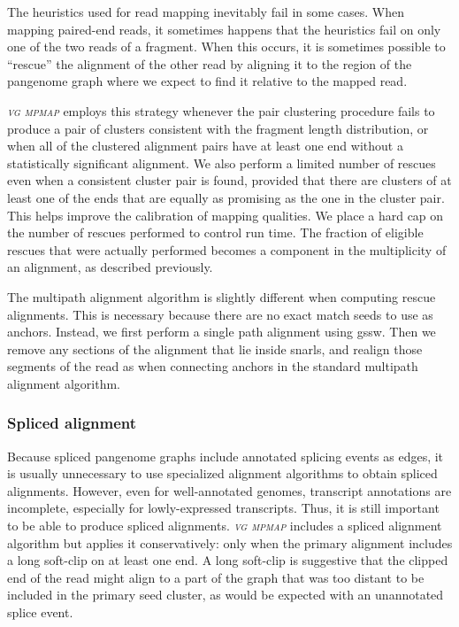 \documentclass[11pt]{ucthesis}
\newcommand{\tool}[1]{\emph{\textsc{#1}}}
\begin{document}
The heuristics used for read mapping inevitably fail in some cases. When mapping paired-end reads, it sometimes happens that the heuristics fail on only one of the two reads of a fragment. When this occurs, it is sometimes possible to ``rescue'' the alignment of the other read by aligning it to the region of the pangenome graph where we expect to find it relative to the mapped read. 

\tool{vg mpmap} employs this strategy whenever the pair clustering procedure fails to produce a pair of clusters consistent with the fragment length distribution, or when all of the clustered alignment pairs have at least one end without a statistically significant alignment. We also perform a limited number of rescues even when a consistent cluster pair is found, provided that there are clusters of at least one of the ends that are equally as promising as the one in the cluster pair. This helps improve the calibration of mapping qualities. We place a hard cap on the number of rescues performed to control run time. The fraction of eligible rescues that were actually performed becomes a component in the multiplicity of an alignment, as described previously.

The multipath alignment algorithm is slightly different when computing rescue alignments. This is necessary because there are no exact match seeds to use as anchors. Instead, we first perform a single path alignment using gssw. Then we remove any sections of the alignment that lie inside snarls, and realign those segments of the read as when connecting anchors in the standard multipath alignment algorithm.

\subsubsection{Spliced alignment}

Because spliced pangenome graphs include annotated splicing events as edges, it is usually unnecessary to use specialized alignment algorithms to obtain spliced alignments. However, even for well-annotated genomes, transcript annotations are incomplete, especially for lowly-expressed transcripts. Thus, it is still important to be able to produce spliced alignments. \tool{vg mpmap} includes a spliced alignment algorithm but applies it conservatively: only when the primary alignment includes a long soft-clip on at least one end. A long soft-clip is suggestive that the clipped end of the read might align to a part of the graph that was too distant to be included in the primary seed cluster, as would be expected with an unannotated splice event.
\end{document}
